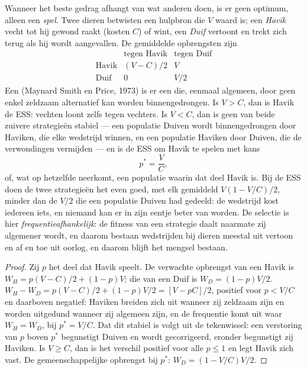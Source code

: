 \begin{proposition}\label{prop:b3:behavioural-ecology:hawk-dove}
Wanneer het beste gedrag afhangt van wat anderen doen, is er geen
optimum, alleen een \emph{spel}. Twee dieren betwisten een hulpbron die
$V$ waard is; een \emph{Havik} vecht tot hij gewond raakt (kosten $C$)
of wint, een \emph{Duif} vertoont en trekt zich terug als hij wordt
aangevallen. De gemiddelde opbrengsten zijn
\[
\begin{array}{c|cc}
 & \text{tegen Havik} & \text{tegen Duif}\\ \hline
\text{Havik} & (V - C)/2 & V\\
\text{Duif} & 0 & V/2
\end{array}
\]
Een \emph{} (Maynard Smith en Price,
1973) is er een die, eenmaal algemeen, door geen enkel zeldzaam
alternatief kan worden binnengedrongen. Is $V > C$, dan is Havik de
ESS: vechten loont zelfs tegen vechters. Is $V
< C$, dan is geen van beide zuivere strategieën stabiel --- een
populatie Duiven wordt binnengedrongen door Haviken, die elke wedstrijd
winnen, en een populatie Haviken door Duiven, die de verwondingen
vermijden --- en is de ESS om Havik te spelen met kans
\[
p^{*} = \frac{V}{C},
\]
of, wat op hetzelfde neerkomt, een populatie waarin dat deel Havik is.
Bij de ESS doen de twee strategieën het even goed, met elk gemiddeld
$V(1 -
V/C)/2$, minder dan de $V/2$ die een populatie Duiven had gedeeld: de
wedstrijd kost iedereen iets, en niemand kan er in zijn eentje beter
van worden. De selectie is hier \emph{frequentieafhankelijk}: de
fitness van een strategie daalt naarmate zij algemener wordt, en daarom
bestaan wedstrijden bij dieren meestal uit vertoon en af en toe uit
oorlog, en daarom blijft het mengsel bestaan.
\end{proposition}
\begin{proof}
Zij $p$ het deel dat Havik speelt. De verwachte opbrengst van een Havik
is $W_{H} = p(V
- C)/2 + (1 - p)V$; die van een Duif is $W_{D} = (1 - p)V/2$. $W_{H} - W_{D} =
p(V - C)/2 + (1 - p)V/2 = [V - pC]/2$, positief voor $p < V/C$ en
daarboven negatief: Haviken breiden zich uit wanneer zij zeldzaam zijn
en worden uitgedund wanneer zij algemeen zijn, en de frequentie komt
uit waar $W_{H} = W_{D}$, bij $p^{*} = V/C$. Dat dit stabiel is volgt
uit de tekenwissel: een verstoring van $p$ boven $p^{*}$ begunstigt
Duiven en wordt gecorrigeerd, eronder begunstigt zij Haviken. Is $V
\ge C$, dan is het verschil positief voor alle $p \le 1$ en legt Havik
zich vast. De gemeenschappelijke opbrengst bij $p^{*}$: $W_{D} = (1 - V/C)V/2$.
\end{proof}

